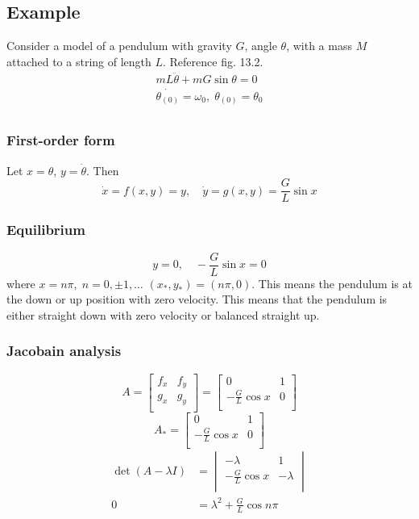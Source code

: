 \documentclass[12pt,twoside]{article}
\begin{document}
\subsection{Example}
Consider a model of a pendulum with gravity $G$, angle $\theta$, with a mass $M$
attached to a string of length $L$. Reference fig. 13.2.
\begin{equation*}
  \begin{aligned}
    mL\ddot{\theta}+mG\sin\theta=0 \\
    \dot{\theta_{(0)}}=\omega_0,\;\theta_{(0)}=\theta_0 \\
  \end{aligned}
\end{equation*}

\subsubsection*{First-order form}
Let $x=\theta$, $y=\dot{\theta}$. Then
$$\dot{x}=f(x,y)=y,\quad \dot{y}=g(x,y)=\frac{G}{L}\sin x$$
\subsubsection*{Equilibrium}
$$y=0,\quad -\frac{G}{L}\sin x=0$$ where $x=n\pi,\;n=0,\pm1,\ldots$
$(x_*,y_*)=(n\pi,0)$. This means the pendulum is at the down or up position with
zero velocity. This means that the pendulum is either straight down with zero
velocity or balanced straight up.
\subsubsection*{Jacobain analysis}
\begin{equation*}
A =
\begin{bmatrix}
  f_x & f_y \\ g_x & g_y \\
\end{bmatrix} =
\begin{bmatrix}
  0 & 1 \\ -\frac{G}{L}\cos x & 0 \\
\end{bmatrix}
\end{equation*}
\begin{equation*}
  A_* =
  \begin{bmatrix}
    0 & 1 \\ -\frac{G}{L}\cos x & 0 \\
  \end{bmatrix}
\end{equation*}
\begin{equation*}
  \begin{aligned}
    \det (A - \lambda I) &=
    \begin{vmatrix}
      -\lambda & 1 \\ -\frac{G}{L}\cos x & -\lambda \\
    \end{vmatrix} \\
    0 &= \lambda^2 + \frac{G}{L}\cos{n\pi}
  \end{aligned}
\end{equation*}
\end{document}
